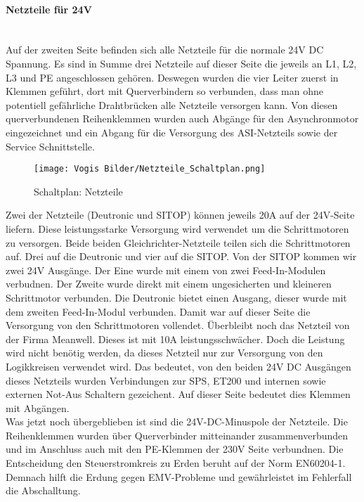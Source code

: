     \paragraph{Netzteile für 24V }\mbox{}\\
    Auf der zweiten Seite befinden sich alle Netzteile für die normale 24V DC Spannung. Es sind in Summe drei Netzteile auf dieser Seite die jeweils an L1, L2, L3 und PE angeschlossen gehören. Deswegen wurden die vier Leiter zuerst in Klemmen geführt, dort mit Querverbindern so verbunden, dass man ohne potentiell gefährliche Drahtbrücken alle Netzteile versorgen kann. Von diesen querverbundenen Reihenklemmen wurden auch Abgänge für den Asynchronmotor eingezeichnet und ein Abgang für die Versorgung des ASI-Netzteils sowie der Service Schnittstelle.\\ 
    \begin{figure}[h]
        \centering
        \texttt{[image: Vogis Bilder/Netzteile\_Schaltplan.png]}
        \caption{Schaltplan: Netzteile}
        \label{fig:Netzteile}
    \end{figure}
    Zwei der Netzteile (Deutronic und SITOP) können jeweils 20A auf der 24V-Seite liefern. Diese leistungsstarke Versorgung wird verwendet um die Schrittmotoren zu versorgen. Beide beiden Gleichrichter-Netzteile teilen sich die Schrittmotoren auf. Drei auf die Deutronic und vier auf die SITOP. Von der SITOP kommen wir zwei 24V Ausgänge. Der Eine wurde mit einem von zwei Feed-In-Modulen verbudnen. Der Zweite wurde direkt mit einem ungesicherten und kleineren Schrittmotor verbunden. Die Deutronic bietet einen Ausgang, dieser wurde mit dem zweiten Feed-In-Modul verbunden. Damit war auf dieser Seite die Versorgung von den Schrittmotoren vollendet. Überbleibt noch das Netzteil von der Firma Meanwell. Dieses ist mit 10A leistungsschwächer. Doch die Leistung wird nicht benötig werden, da dieses Netzteil nur zur Versorgung von den Logikkreisen verwendet wird. Das bedeutet, von den beiden 24V DC Ausgängen dieses Netzteils wurden Verbindungen zur SPS, ET200 und internen sowie externen Not-Aus Schaltern gezeichent. Auf dieser Seite bedeutet dies Klemmen mit Abgängen.\\    
    Was jetzt noch übergeblieben ist sind die 24V-DC-Minuspole der Netzteile. Die Reihenklemmen wurden über Querverbinder mitteinander zusammenverbunden und im Anschluss auch mit den PE-Klemmen der 230V Seite verbundnen. Die Entscheidung den Steuerstromkreis zu Erden beruht auf der Norm EN60204-1. Demnach hilft die Erdung gegen EMV-Probleme und gewährleistet im Fehlerfall die Abschalltung. \cite{elektronet_steuerstromkreis_geerdet}\cite{beckhoff_steuerstromkreis_geerdet}
